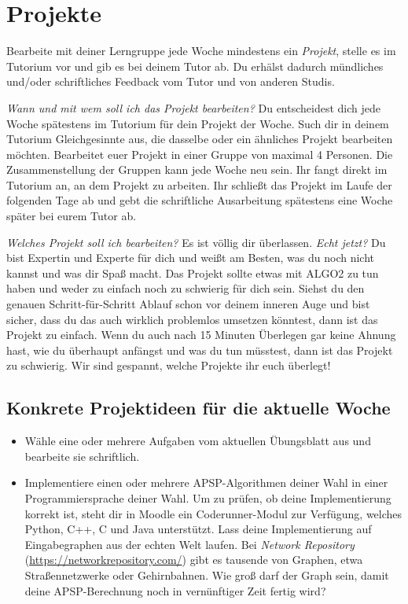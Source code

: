 \documentclass{uebung_cs}
\begin{document}
\newpage
\section*{ Projekte}

Bearbeite mit deiner Lerngruppe jede Woche mindestens ein \emph{Projekt}, stelle es im Tutorium vor und gib es bei deinem Tutor ab.
Du erhälst dadurch mündliches und/oder schriftliches Feedback vom Tutor und von anderen Studis.

\emph{Wann und mit wem soll ich das Projekt bearbeiten?}
Du entscheidest dich jede Woche spätestens im Tutorium für dein Projekt der Woche.
Such dir in deinem Tutorium Gleichgesinnte aus, die dasselbe oder ein ähnliches Projekt bearbeiten möchten.
Bearbeitet euer Projekt in einer Gruppe von maximal 4 Personen.
Die Zusammenstellung der Gruppen kann jede Woche neu sein.
Ihr fangt direkt im Tutorium an, an dem Projekt zu arbeiten.
Ihr schließt das Projekt im Laufe der folgenden Tage ab und gebt die schriftliche Ausarbeitung spätestens eine Woche später bei eurem Tutor ab.

\emph{Welches Projekt soll ich bearbeiten?}
Es ist völlig dir überlassen.
\emph{Echt jetzt?}
Du bist Expertin und Experte für dich und weißt am Besten, was du noch nicht kannst und was dir Spaß macht.
Das Projekt sollte etwas mit ALGO2 zu tun haben und weder zu einfach noch zu schwierig für dich sein. Siehst du den genauen Schritt-für-Schritt Ablauf schon vor deinem inneren Auge und bist sicher, dass du das auch wirklich problemlos umsetzen könntest, dann ist das Projekt zu einfach.
Wenn du auch nach 15 Minuten Überlegen gar keine Ahnung hast, wie du überhaupt anfängst und was du tun müsstest, dann ist das Projekt zu schwierig.
Wir sind gespannt, welche Projekte ihr euch überlegt!

\subsection*{Konkrete Projektideen für die aktuelle Woche}
\begin{itemize}
  \item
  Wähle eine oder mehrere Aufgaben vom aktuellen Übungsblatt aus und bearbeite sie schriftlich.
  \item
  Implementiere einen oder mehrere APSP-Algorithmen deiner Wahl in einer Programmiersprache deiner Wahl.
  Um zu prüfen, ob deine Implementierung korrekt ist, steht dir in Moodle ein Coderunner-Modul zur Verfügung, welches Python, C++, C und Java unterstützt.
  Lass deine Implementierung auf Eingabegraphen aus der echten Welt laufen.
  Bei \emph{Network Repository} (\url{https://networkrepository.com/}) gibt es tausende von Graphen, etwa Straßennetzwerke oder Gehirnbahnen.
  Wie groß darf der Graph sein, damit deine APSP-Berechnung noch in vernünftiger Zeit fertig wird?
\end{itemize}
\end{document}
